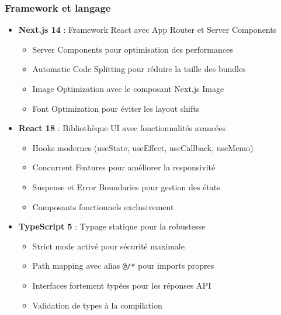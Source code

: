 \documentclass[12pt,a4paper]{report}
\begin{document}
\subsubsection{Framework et langage}
\begin{itemize}
\item \textbf{Next.js 14} : Framework React avec App Router et Server Components

  \begin{itemize}
  \item Server Components pour optimisation des performances
  \item Automatic Code Splitting pour réduire la taille des bundles
  \item Image Optimization avec le composant Next.js Image
  \item Font Optimization pour éviter les layout shifts
  \end{itemize}
\item \textbf{React 18} : Bibliothèque UI avec fonctionnalités avancées
  \begin{itemize}
  \item Hooks modernes (useState, useEffect, useCallback, useMemo)
  \item Concurrent Features pour améliorer la responsivité
  \item Suspense et Error Boundaries pour gestion des états
  \item Composants fonctionnels exclusivement
  \end{itemize}
\item \textbf{TypeScript 5} : Typage statique pour la robustesse
  \begin{itemize}
  \item Strict mode activé pour sécurité maximale
  \item Path mapping avec alias \texttt{@/*} pour imports propres
  \item Interfaces fortement typées pour les réponses API
  \item Validation de types à la compilation
  \end{itemize}
\end{itemize}
\end{document}
